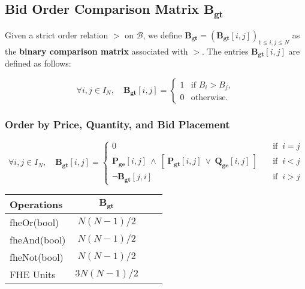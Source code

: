 
\subsection{Bid Order Comparison Matrix $\mathbf{B_{gt}}$}

Given a strict order relation $>$ on $\mathcal{B}$, we define $\mathbf{B_{gt}} = (\mathbf{B_{gt}}[i, j])_{1 \le i, j \le N}$ as the \textbf{binary comparison matrix} associated with $>$. The entries $\mathbf{B_{gt}}[i, j]$ are defined as follows:

\begin{equation*}
    \forall i, j \in I_N, \quad \mathbf{B_{gt}}[i, j] = 
    \begin{cases}
        1  & \text{if } B_i > B_j, \\
        0  & \text{otherwise}.
    \end{cases}
\end{equation*}

\subsubsection{Order by Price, Quantity, and Bid Placement}

\begin{equation*}
    \forall i,j \in I_N, \quad \mathbf{B_{gt}}[i, j] = 
    \begin{cases}
        0  \quad &\text{if } \ i = j \\
        \mathbf{P_{ge}}[i, j] \ \land \ [ \ \mathbf{P_{gt}}[i, j] \ \lor \ \mathbf{Q_{ge}}[i, j] \ ]  \quad &\text{if } \ i < j \\
        \neg \mathbf{B_{gt}}[j, i] \quad &\text{if } \ i > j
    \end{cases}
\end{equation*}

\setlength{\parindent}{0pt}
\renewcommand{\arraystretch}{1.5}
\begin{tabular}{ |l|c|c|c| }
    \hline    
    Operations & $\mathbf{B_{gt}}$ \\ 
    \hline
    fheOr(bool)          & $N(N-1)/2$   \\
    fheAnd(bool)         & $N(N-1)/2$   \\
    fheNot(bool)         & $N(N-1)/2$   \\
    \hline
    \hline
    FHE Units           & $3N(N-1)/2$  \\
    \hline
\end{tabular}

